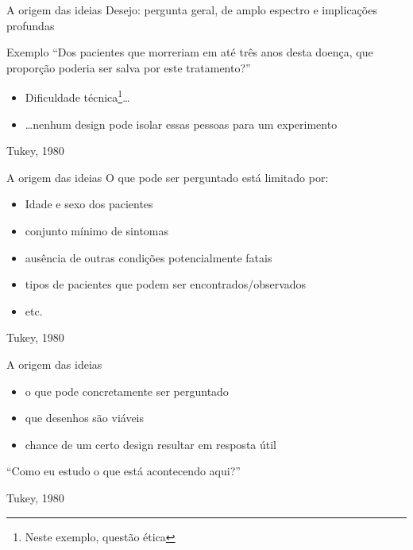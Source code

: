 \documentclass{beamer}
\begin{document}
\begin{frame}{A origem das ideias}
  \scriptsize
  Desejo: pergunta geral, de amplo espectro e implicações profundas
  \bigskip
  \begin{exampleblock}{Exemplo}
    \scriptsize
    ``Dos pacientes que morreriam em até três anos desta doença, que
    proporção poderia ser salva por este tratamento?''
  \end{exampleblock}
  \bigskip
  \begin{itemize}
    \footnotesize
  \item Dificuldade técnica\footnote{Neste exemplo, questão ética}\ldots
    \bigskip
  \item \ldots nenhum design pode isolar essas pessoas para um experimento
  \end{itemize}

  \vfill
  \scriptsize
  \hfill Tukey, 1980
\end{frame}

\begin{frame}{A origem das ideias}
  \scriptsize
  O que \alert{pode} ser perguntado está limitado por:
  \bigskip
  \begin{itemize}
    \footnotesize
  \item Idade e sexo dos pacientes
    \bigskip
  \item conjunto mínimo de sintomas
    \bigskip
  \item ausência de outras condições potencialmente fatais
    \bigskip
  \item tipos de pacientes que podem ser encontrados/observados
  \item etc.
  \end{itemize}

  \vfill
  \scriptsize
  \hfill Tukey, 1980
\end{frame}

\begin{frame}{A origem das ideias}
  \begin{itemize}
    \footnotesize
  \item o que pode concretamente ser perguntado
    \bigskip
  \item que desenhos são viáveis
    \bigskip
  \item chance de um certo design resultar em resposta útil
  \end{itemize}
  \bigskip
  \pause
  \begin{block}{}
    { ``Como eu estudo o que está acontecendo aqui?''}
  \end{block}

  \vfill
  \scriptsize
  \hfill Tukey, 1980
\end{frame}
\end{document}
